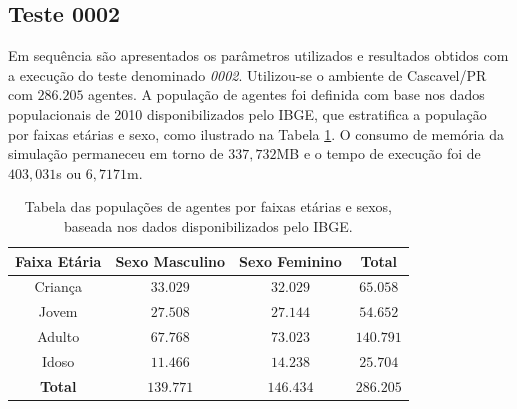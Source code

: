% 

\subsection{Teste 0002}

Em sequência são apresentados os parâmetros utilizados e resultados obtidos com a execução do teste denominado \textit{0002}. Utilizou-se o ambiente de Cascavel/PR com $286.205$ agentes. A população de agentes foi definida com base nos dados populacionais de 2010 disponibilizados pelo IBGE, que estratifica a população por faixas etárias e sexo, como ilustrado na Tabela \ref{tab:populacoes_0002}. O consumo de memória da simulação permaneceu em torno de $337,732$MB e o tempo de execução foi de $403,031$s ou $6,7171$m. \\

\begin{table}[H]
\centering
\begin{tabular}{c|c|c|c}
 \textbf{Faixa Etária} 		& \textbf{Sexo Masculino}	& \textbf{Sexo Feminino}	& \textbf{Total}	\\ \hline
  Criança			& $33.029$			& $32.029$			& $65.058$		\\
  Jovem				& $27.508$			& $27.144$			& $54.652$		\\
  Adulto			& $67.768$			& $73.023$			& $140.791$		\\
  Idoso				& $11.466$			& $14.238$ 			& $25.704$		\\ \hline
  \textbf{Total}		& $139.771$			& $146.434$			& $286.205$		\\
\end{tabular}
\caption{Tabela das populações de agentes por faixas etárias e sexos, baseada nos dados disponibilizados pelo IBGE.}
\label{tab:populacoes_0002}
\end{table}


